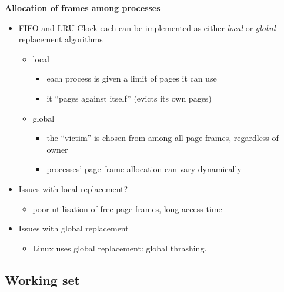 \documentclass[11pt,a4paper]{article}
\begin{document}
\textbf{Allocation of frames among processes}
\begin{itemize}
    \item FIFO and LRU Clock each can be implemented as either \emph{local} or \emph{global}
        replacement algorithms
        \begin{itemize}
            \item local
                \begin{itemize}
                    \item each process is given a limit of pages it can use
                    \item it ``pages against itself'' (evicts its own pages)
                \end{itemize}
            \item global
                \begin{itemize}
                    \item the ``victim'' is chosen from among all page frames, regardless of
                        owner
                    \item processes' page frame allocation can vary dynamically
                \end{itemize}
        \end{itemize}
    \item Issues with local replacement?
        \begin{itemize}
            \item poor utilisation of free page frames, long access time
        \end{itemize}
    \item Issues with global replacement
        \begin{itemize}
            \item Linux uses global replacement: global thrashing.
        \end{itemize}
\end{itemize}

\subsection{Working set}
\end{document}
